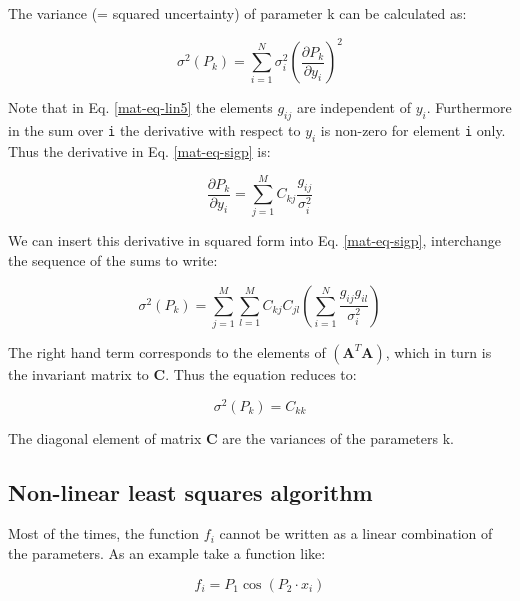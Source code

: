 The variance (= squared uncertainty) of parameter k can be calculated as:

\begin{equation} 
  \sigma^2(P_k) = \sum_{i=1}^{N} \sigma_{i}^{2} \left (
  \frac{\partial{P_{k}}}{\partial{y_{i}}} \right )^2
  \label{mat-eq-sigp}
\end{equation}

Note that in Eq. \ref{mat-eq-lin5} the elements $g_{ij}$ are independent of
$y_{i}$. Furthermore in the sum over {\tt i} the derivative with respect to $y_{i}$
is non-zero for element {\tt i} only. Thus the derivative in Eq. \ref{mat-eq-sigp} is:

\begin{equation}
  \frac{\partial{P_{k}}}{\partial{y_{i}}}
  = \sum_{j=1}^{M} C_{kj} \frac{g_{ij}}{\sigma_{i}^2}
  \label{mat-eq-derp}
\end{equation}

We can insert this derivative in squared form into Eq. \ref{mat-eq-sigp},
interchange the sequence of the sums to write:

\begin{equation}
  \sigma^2(P_k) =
  \sum_{j=1}^{M} \sum_{l=1}^{M} C_{kj} C_{jl}
  \left (
    \sum_{i=1}^{N} \frac{g_{ij}g_{il}}{\sigma_{i}^2}
  \right)
  \label{mat-eq-sigp2}
\end{equation}

The right hand term corresponds to the elements of 
$\left ( \mathbf{A}^T \mathbf{A} \right )$, which in turn is the invariant
matrix to $\mathbf{C}$. Thus the equation reduces to:

\begin{equation}
  \sigma^2(P_k) = C_{kk}
  \label{mat-eq-sigpf}
\end{equation}

The diagonal element of matrix $\mathbf{C}$ are the variances of the parameters k.

\subsection{Non-linear least squares algorithm \label{math-nlin}} 

Most of the times, the function $f_{i}$ cannot be written as a linear combination
of the parameters. As an example take a function like:

\begin{equation}
  f_{i} = P_{1} \cos(P_{2} \cdot x_{i})
\end{equation}


